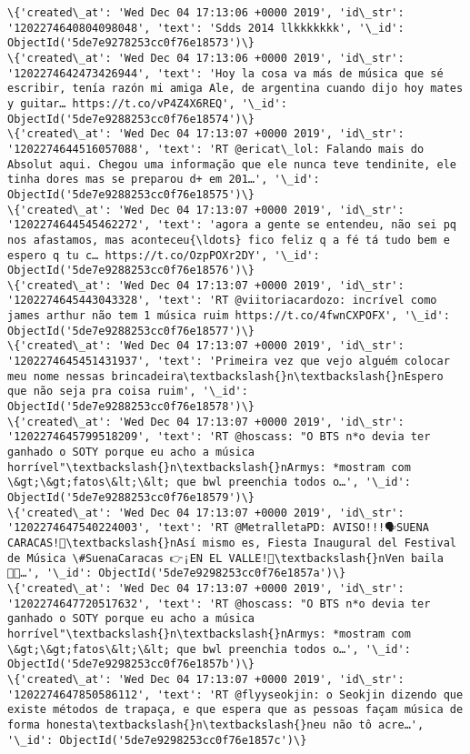 \documentclass[11pt]{article}
\begin{document}
\begin{Verbatim}[commandchars=\\\{\}]
\{'created\_at': 'Wed Dec 04 17:13:06 +0000 2019', 'id\_str': '1202274640804098048', 'text': 'Sdds 2014 llkkkkkkk', '\_id': ObjectId('5de7e9278253cc0f76e18573')\}
\{'created\_at': 'Wed Dec 04 17:13:06 +0000 2019', 'id\_str': '1202274642473426944', 'text': 'Hoy la cosa va más de música que sé escribir, tenía razón mi amiga Ale, de argentina cuando dijo hoy mates y guitar… https://t.co/vP4Z4X6REQ', '\_id': ObjectId('5de7e9288253cc0f76e18574')\}
\{'created\_at': 'Wed Dec 04 17:13:07 +0000 2019', 'id\_str': '1202274644516057088', 'text': 'RT @ericat\_lol: Falando mais do Absolut aqui. Chegou uma informação que ele nunca teve tendinite, ele tinha dores mas se preparou d+ em 201…', '\_id': ObjectId('5de7e9288253cc0f76e18575')\}
\{'created\_at': 'Wed Dec 04 17:13:07 +0000 2019', 'id\_str': '1202274644545462272', 'text': 'agora a gente se entendeu, não sei pq nos afastamos, mas aconteceu{\ldots} fico feliz q a fé tá tudo bem e espero q tu c… https://t.co/OzpPOXr2DY', '\_id': ObjectId('5de7e9288253cc0f76e18576')\}
\{'created\_at': 'Wed Dec 04 17:13:07 +0000 2019', 'id\_str': '1202274645443043328', 'text': 'RT @viitoriacardozo: incrível como james arthur não tem 1 música ruim https://t.co/4fwnCXPOFX', '\_id': ObjectId('5de7e9288253cc0f76e18577')\}
\{'created\_at': 'Wed Dec 04 17:13:07 +0000 2019', 'id\_str': '1202274645451431937', 'text': 'Primeira vez que vejo alguém colocar meu nome nessas brincadeira\textbackslash{}n\textbackslash{}nEspero que não seja pra coisa ruim', '\_id': ObjectId('5de7e9288253cc0f76e18578')\}
\{'created\_at': 'Wed Dec 04 17:13:07 +0000 2019', 'id\_str': '1202274645799518209', 'text': 'RT @hoscass: "O BTS n*o devia ter ganhado o SOTY porque eu acho a música horrível"\textbackslash{}n\textbackslash{}nArmys: *mostram com \&gt;\&gt;fatos\&lt;\&lt; que bwl preenchia todos o…', '\_id': ObjectId('5de7e9288253cc0f76e18579')\}
\{'created\_at': 'Wed Dec 04 17:13:07 +0000 2019', 'id\_str': '1202274647540224003', 'text': 'RT @MetralletaPD: AVISO!!!🗣️SUENA CARACAS!🎉\textbackslash{}nAsí mismo es, Fiesta Inaugural del Festival de Música \#SuenaCaracas 👉¡EN EL VALLE!🎉\textbackslash{}nVen baila💃🏽…', '\_id': ObjectId('5de7e9298253cc0f76e1857a')\}
\{'created\_at': 'Wed Dec 04 17:13:07 +0000 2019', 'id\_str': '1202274647720517632', 'text': 'RT @hoscass: "O BTS n*o devia ter ganhado o SOTY porque eu acho a música horrível"\textbackslash{}n\textbackslash{}nArmys: *mostram com \&gt;\&gt;fatos\&lt;\&lt; que bwl preenchia todos o…', '\_id': ObjectId('5de7e9298253cc0f76e1857b')\}
\{'created\_at': 'Wed Dec 04 17:13:07 +0000 2019', 'id\_str': '1202274647850586112', 'text': 'RT @flyyseokjin: o Seokjin dizendo que existe métodos de trapaça, e que espera que as pessoas façam música de forma honesta\textbackslash{}n\textbackslash{}neu não tô acre…', '\_id': ObjectId('5de7e9298253cc0f76e1857c')\}

\end{Verbatim}
\end{document}
